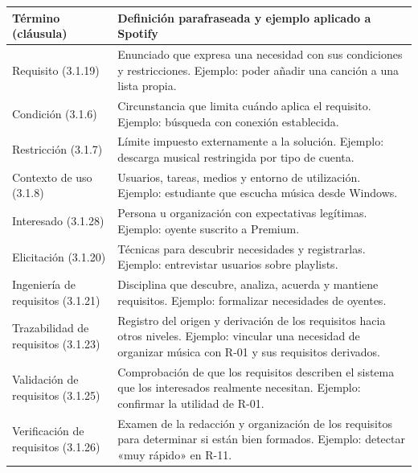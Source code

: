 \begingroup\footnotesize
\begin{longtable}{@{}p{.22\linewidth}p{.74\linewidth}@{}}\toprule
\textbf{Término (cláusula)} & \textbf{Definición parafraseada y ejemplo aplicado a Spotify}\\\midrule\endhead
Requisito (3.1.19) & Enunciado que expresa una necesidad con sus condiciones y restricciones. Ejemplo: poder añadir una canción a una lista propia.\\
Condición (3.1.6) & Circunstancia que limita cuándo aplica el requisito. Ejemplo: búsqueda con conexión establecida.\\
Restricción (3.1.7) & Límite impuesto externamente a la solución. Ejemplo: descarga musical restringida por tipo de cuenta.\\
Contexto de uso (3.1.8) & Usuarios, tareas, medios y entorno de utilización. Ejemplo: estudiante que escucha música desde Windows.\\
Interesado (3.1.28) & Persona u organización con expectativas legítimas. Ejemplo: oyente suscrito a Premium.\\
Elicitación (3.1.20) & Técnicas para descubrir necesidades y registrarlas. Ejemplo: entrevistar usuarios sobre playlists.\\
Ingeniería de requisitos (3.1.21) & Disciplina que descubre, analiza, acuerda y mantiene requisitos. Ejemplo: formalizar necesidades de oyentes.\\
Trazabilidad de requisitos (3.1.23) & Registro del origen y derivación de los requisitos hacia otros niveles. Ejemplo: vincular una necesidad de organizar música con R-01 y sus requisitos derivados.\\
Validación de requisitos (3.1.25) & Comprobación de que los requisitos describen el sistema que los interesados realmente necesitan. Ejemplo: confirmar la utilidad de R-01.\\
Verificación de requisitos (3.1.26) & Examen de la redacción y organización de los requisitos para determinar si están bien formados. Ejemplo: detectar «muy rápido» en R-11.\\
\bottomrule\end{longtable}\endgroup
